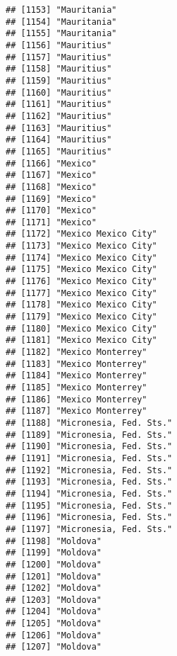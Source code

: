 \documentclass[]{article}
\begin{document}
\begin{verbatim}
## [1153] "Mauritania"                         
## [1154] "Mauritania"                         
## [1155] "Mauritania"                         
## [1156] "Mauritius"                          
## [1157] "Mauritius"                          
## [1158] "Mauritius"                          
## [1159] "Mauritius"                          
## [1160] "Mauritius"                          
## [1161] "Mauritius"                          
## [1162] "Mauritius"                          
## [1163] "Mauritius"                          
## [1164] "Mauritius"                          
## [1165] "Mauritius"                          
## [1166] "Mexico"                             
## [1167] "Mexico"                             
## [1168] "Mexico"                             
## [1169] "Mexico"                             
## [1170] "Mexico"                             
## [1171] "Mexico"                             
## [1172] "Mexico Mexico City"                 
## [1173] "Mexico Mexico City"                 
## [1174] "Mexico Mexico City"                 
## [1175] "Mexico Mexico City"                 
## [1176] "Mexico Mexico City"                 
## [1177] "Mexico Mexico City"                 
## [1178] "Mexico Mexico City"                 
## [1179] "Mexico Mexico City"                 
## [1180] "Mexico Mexico City"                 
## [1181] "Mexico Mexico City"                 
## [1182] "Mexico Monterrey"                   
## [1183] "Mexico Monterrey"                   
## [1184] "Mexico Monterrey"                   
## [1185] "Mexico Monterrey"                   
## [1186] "Mexico Monterrey"                   
## [1187] "Mexico Monterrey"                   
## [1188] "Micronesia, Fed. Sts."              
## [1189] "Micronesia, Fed. Sts."              
## [1190] "Micronesia, Fed. Sts."              
## [1191] "Micronesia, Fed. Sts."              
## [1192] "Micronesia, Fed. Sts."              
## [1193] "Micronesia, Fed. Sts."              
## [1194] "Micronesia, Fed. Sts."              
## [1195] "Micronesia, Fed. Sts."              
## [1196] "Micronesia, Fed. Sts."              
## [1197] "Micronesia, Fed. Sts."              
## [1198] "Moldova"                            
## [1199] "Moldova"                            
## [1200] "Moldova"                            
## [1201] "Moldova"                            
## [1202] "Moldova"                            
## [1203] "Moldova"                            
## [1204] "Moldova"                            
## [1205] "Moldova"                            
## [1206] "Moldova"                            
## [1207] "Moldova"                            

\end{verbatim}
\end{document}

